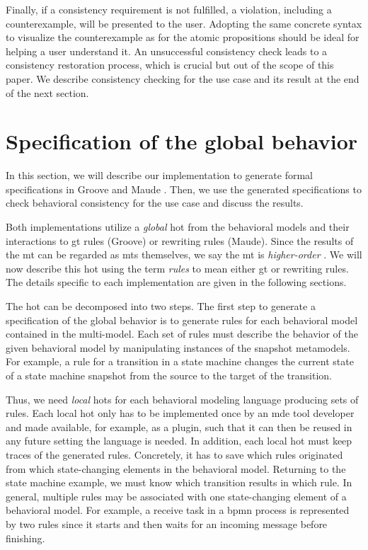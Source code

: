 \documentclass{jot}
\begin{document}
Finally, if a consistency requirement is not fulfilled, a violation, including a counterexample, will be presented to the user.
Adopting the same concrete syntax to visualize the counterexample as for the atomic propositions should be ideal for helping a user understand it. 
An unsuccessful consistency check leads to a consistency restoration process, which is crucial but out of the scope of this paper.
We describe consistency checking for the use case and its result at the end of the next section.


\section{Specification of the global behavior} \label{sec:specification_of_the_global_behavior}
In this section, we will describe our implementation to generate formal specifications in Groove \cite{rensinkGROOVESimulatorTool2004} and Maude \cite{clavelAllMaudeHighPerformance2007}.
Then, we use the generated specifications to check behavioral consistency for the use case and discuss the results.

Both implementations utilize a \emph{global} \gls*{hot} from the behavioral models and their interactions to \gls*{gt} rules (Groove) or rewriting rules (Maude).
Since the results of the \gls*{mt} can be regarded as \gls*{mt}s themselves, we say the \gls*{mt} is \textit{higher-order} \cite{tisiUseHigherOrderModel2009}.
We will now describe this \gls*{hot} using the term \emph{rules} to mean either \gls*{gt} or rewriting rules.
The details specific to each implementation are given in the following sections.

The \gls*{hot} can be decomposed into two steps.
The first step to generate a specification of the global behavior is to generate rules for each behavioral model contained in the multi-model.
Each set of rules must describe the behavior of the given behavioral model by manipulating instances of the snapshot metamodels.
For example, a rule for a transition in a state machine changes the current state of a state machine snapshot from the source to the target of the transition. 

Thus, we need \emph{local} \gls*{hot}s for each behavioral modeling language producing sets of rules.
Each local \gls*{hot} only has to be implemented once by an \gls*{mde} tool developer and made available, for example, as a plugin, such that it can then be reused in any future setting the language is needed.
In addition, each local \gls*{hot} must keep traces of the generated rules.
Concretely, it has to save which rules originated from which state-changing elements in the behavioral model.
Returning to the state machine example, we must know which transition results in which rule.
In general, multiple rules may be associated with one state-changing element of a behavioral model.
For example, a receive task in a \gls*{bpmn} process is represented by two rules since it starts and then waits for an incoming message before finishing.
\end{document}
